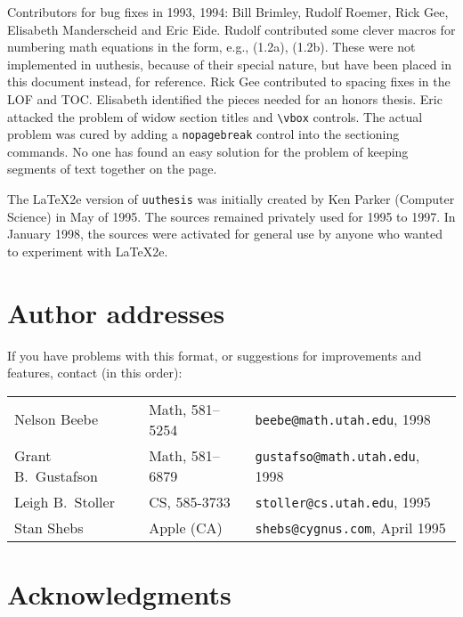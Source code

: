 Contributors for bug fixes in 1993, 1994: Bill Brimley, Rudolf Roemer,
Rick Gee, Elisabeth Manderscheid and Eric Eide. Rudolf contributed some
clever macros for numbering math equations in the form, e.g., (1.2a),
(1.2b). These were not implemented in uuthesis, because of their special
nature, but have been placed in this document instead, for reference.
Rick Gee contributed to spacing fixes in the LOF and TOC. Elisabeth
identified the pieces needed for an honors thesis. Eric attacked the
problem of widow section titles and \verb"\vbox" controls. The actual
problem was cured by adding a {\tt nopagebreak} control into the
sectioning commands. No one has found an easy solution for the problem
of keeping segments of text together on the page.

The \LaTeX{}2e version of {\tt uuthesis} was initially created by Ken
Parker (Computer Science) in May of 1995. The sources remained privately
used for 1995 to 1997. In January 1998, the sources were activated for
general use by anyone who wanted to experiment with \LaTeX{}2e.


\section{Author addresses}
If you have problems with this format, or suggestions for improvements
and features, contact (in this order):
\begin{center}\footnotesize
\begin{tabular}{lll}
Nelson Beebe & Math, 581--5254 & \verb|beebe@math.utah.edu|, 1998 \\
Grant B.\ Gustafson & Math, 581--6879 & \verb|gustafso@math.utah.edu|,
1998\\
Leigh B.\ Stoller & CS, 585-3733 & \verb|stoller@cs.utah.edu|, 1995 \\
Stan Shebs & Apple (CA) & \verb|shebs@cygnus.com|, April 1995 \\
\end{tabular}
\end{center}

\section{Acknowledgments}

